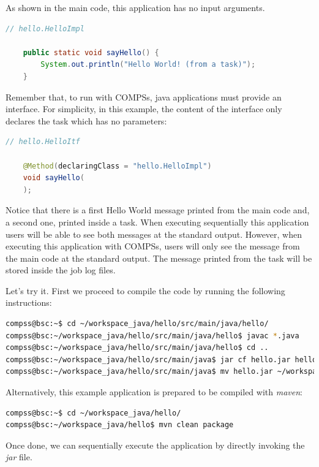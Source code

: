 As shown in the main code, this application has no input arguments. 

\begin{lstlisting}[language=java]
	// hello.HelloImpl
	
	public static void sayHello() {
		System.out.println("Hello World! (from a task)");
	}
\end{lstlisting}

Remember that, to run with COMPSs, java applications must provide an interface. For simplicity, in this example, the content of the interface only
declares the task which has no parameters:

\begin{lstlisting}[language=java]
	// hello.HelloItf
	
	@Method(declaringClass = "hello.HelloImpl")
	void sayHello(
	);
\end{lstlisting}

Notice that there is a first Hello World message printed from the main code and, a second one, printed inside a task. When executing sequentially
this application users will be able to see both messages at the standard output. However, when executing this application with COMPSs, users will only
see the message from the main code at the standard output. The message printed from the task will be stored inside the job log files. 

Let's try it. First we proceed to compile the code by running the following instructions:

\begin{lstlisting}[language=bash]
compss@bsc:~$ cd ~/workspace_java/hello/src/main/java/hello/
compss@bsc:~/workspace_java/hello/src/main/java/hello$ javac *.java
compss@bsc:~/workspace_java/hello/src/main/java/hello$ cd ..
compss@bsc:~/workspace_java/hello/src/main/java$ jar cf hello.jar hello
compss@bsc:~/workspace_java/hello/src/main/java$ mv hello.jar ~/workspace_java/hello/jar/
\end{lstlisting}

Alternatively, this example application is prepared to be compiled with \textit{maven}:

\begin{lstlisting}[language=bash]
compss@bsc:~$ cd ~/workspace_java/hello/
compss@bsc:~/workspace_java/hello$ mvn clean package
\end{lstlisting}

Once done, we can sequentially execute the application by directly invoking the \textit{jar} file.

